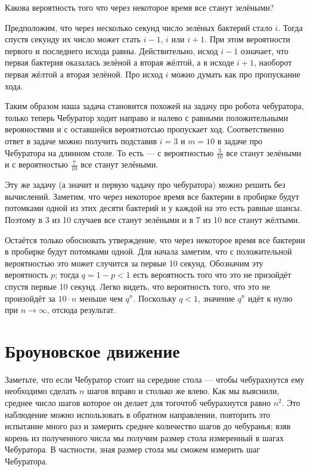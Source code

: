 \documentclass{article}
\begin{document}
Какова вероятность того что через некоторое время все станут зелёными?


Предположим, что через несколько секунд 
число зелёных бактерий стало $i$.
Тогда спустя секунду их число может стать $i-1$, $i$ или $i+1$.
При этом вероятности первого и последнего исхода равны.
Действительно, исход $i-1$ означает, 
что первая бактерия оказалась зелёной а вторая жёлтой,
а в исходе $i+1$,
наоборот первая жёлтой а вторая зелёной.
Про исход $i$ можно думать как про пропускание хода.

Таким образом наша задача становится похожей на задачу про робота чебуратора, только теперь Чебуратор ходит направо и налево с равными положительными верояностями и с оставшейся вероятнотсью пропускает ход.
Соответственно ответ в задаче можно получить подставив $i=3$ и $m=10$ в задаче про Чебуратора на длинном столе.
То есть --- с вероятностью $\tfrac{3}{10}$ все станут зелёными 
и с вероятностью $\tfrac{7}{10}$ все станут зелёными.

\medskip

Эту же задачу (а значит и первую чадачу про чебуратора)
можно решить без вычислений.
Заметим, что через некоторое время все бактерии в пробирке будут потомками одной из этих десяти бактерий и у каждой на это есть равные шансы.
Поэтому в 3 из 10 случаев все станут зелёными и в 7 из 10 все станут жёлтыми.

Остаётся только обосновать утверждение, что через некоторое время все бактерии в пробирке будут потомками одной.
Для начала заметим, что с положительной вероятностью это может случится за первые 10 секунд. 
Обозначим эту вероятность $p$;
тогда $q=1-p<1$ есть вероятность того что это не призойдёт спустя первые 10 секунд. 
Легко видеть, что вероятность того, что это не произойдёт за $10\cdot n$ меньше чем $q^n$.
Поскольку $q<1$, значение $q^n$ идёт к нулю при $n\to\infty$,
отсюда результат.

\section{Броуновское движение}

Заметьте, что если Чебуратор стоит на середине стола ---
чтобы чебурахнутся ему необходимо сделать $n$ шагов вправо и столько же влево.
Как мы выяснили, 
среднее число шагов которое он делает для тогочтоб чебурахнутся 
равно $n^2$.
Это наблюдение можно использовать в обратном направлении,
повторить это испытание много раз и 
замерить среднее количество шагов до чебуранья;
взяв корень из полученного числа мы получим размер стола 
измеренный в шагах Чебуратора.
В частности, зная размер стола мы сможем измерить шаг Чебуратора.
\end{document}
